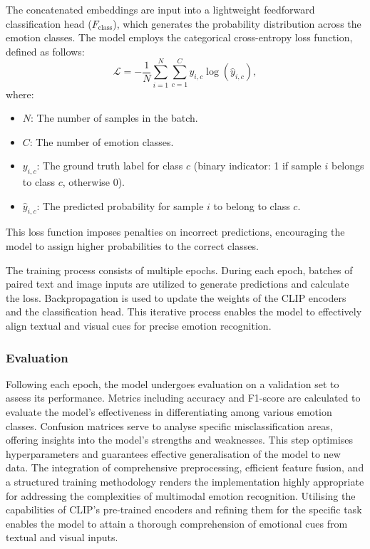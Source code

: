 \documentclass{article}
\theoremstyle{plain}
\theoremstyle{definition}
\theoremstyle{remark}
\begin{document}
The concatenated embeddings are input into a lightweight feedforward classification head (\(F_{\text{class}}\)), which generates the probability distribution across the emotion classes. The model employs the categorical cross-entropy loss function, defined as follows:
\[
\mathcal{L} = -\frac{1}{N} \sum_{i=1}^{N} \sum_{c=1}^{C} y_{i,c} \log(\hat{y}_{i,c}),
\]
where:
\begin{itemize}
    \item \(N\): The number of samples in the batch.
    \item \(C\): The number of emotion classes.
    \item \(y_{i,c}\): The ground truth label for class \(c\) (binary indicator: 1 if sample \(i\) belongs to class \(c\), otherwise 0).
    \item \(\hat{y}_{i,c}\): The predicted probability for sample \(i\) to belong to class \(c\).
\end{itemize}

This loss function imposes penalties on incorrect predictions, encouraging the model to assign higher probabilities to the correct classes.

The training process consists of multiple epochs. During each epoch, batches of paired text and image inputs are utilized to generate predictions and calculate the loss. Backpropagation is used to update the weights of the CLIP encoders and the classification head. This iterative process enables the model to effectively align textual and visual cues for precise emotion recognition.

\subsubsection{Evaluation}

Following each epoch, the model undergoes evaluation on a validation set to assess its performance. Metrics including accuracy and F1-score are calculated to evaluate the model's effectiveness in differentiating among various emotion classes. Confusion matrices serve to analyse specific misclassification areas, offering insights into the model's strengths and weaknesses. This step optimises hyperparameters and guarantees effective generalisation of the model to new data.
The integration of comprehensive preprocessing, efficient feature fusion, and a structured training methodology renders the implementation highly appropriate for addressing the complexities of multimodal emotion recognition. Utilising the capabilities of CLIP’s pre-trained encoders and refining them for the specific task enables the model to attain a thorough comprehension of emotional cues from textual and visual inputs.
\end{document}
